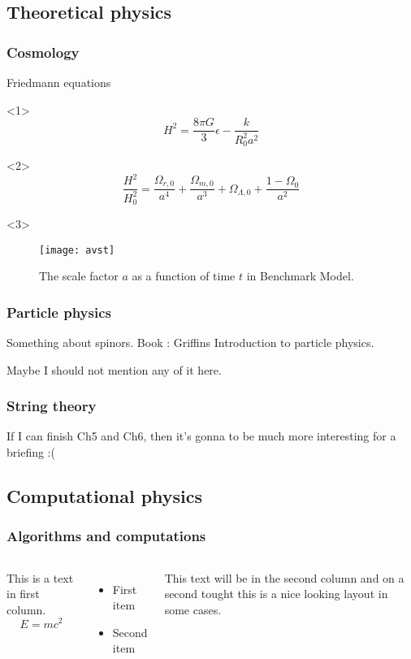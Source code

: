\documentclass{beamer}
\begin{document}
\subsection{Theoretical physics}
\begin{frame}
  \frametitle{Cosmology}
    \begin{alertblock}{Friedmann equations}
      \begin{onlyenv}<1>
        $$H^2 = \frac{8\pi G}{3}\epsilon-\frac{k}{R_0^2a^2}$$
      \end{onlyenv}
      \begin{onlyenv}<2>
        $$\frac{H^2}{H_0^2} =
        \frac{\Omega_{r,0}}{a^4} + \frac{\Omega_{m,0}}{a^3} +
        \Omega_{\Lambda,0} + \frac{1-\Omega_0}{a^2}$$
      \end{onlyenv}
  \end{alertblock}
  \begin{onlyenv}<3>
    \begin{figure}
      \centering
      \texttt{[image: avst]}
      \caption{The scale factor $a$ as a function of time $t$ in
        Benchmark Model.}
    \end{figure}
  \end{onlyenv}

\end{frame}

\begin{frame}
  \frametitle{Particle physics}
  Something about spinors.
  Book : Griffins Introduction to particle physics.\par  
  Maybe I should not mention any of it here.
  
\end{frame}

\begin{frame}
  \frametitle{String theory}
  If I can finish Ch5 and Ch6, then it's gonna to be much more
  interesting for a briefing :(
  
\end{frame}

\subsection{Computational physics}
\begin{frame}
  \frametitle{Algorithms and computations}
  \begin{columns}
    This is a text in first column.
    $$E=mc^2$$
    \begin{itemize}
    \item First item
    \item Second item
    \end{itemize}

    This text will be in the second column
    and on a second tought this is a nice looking
    layout in some cases.
  \end{columns}
  
\end{frame}
\end{document}
